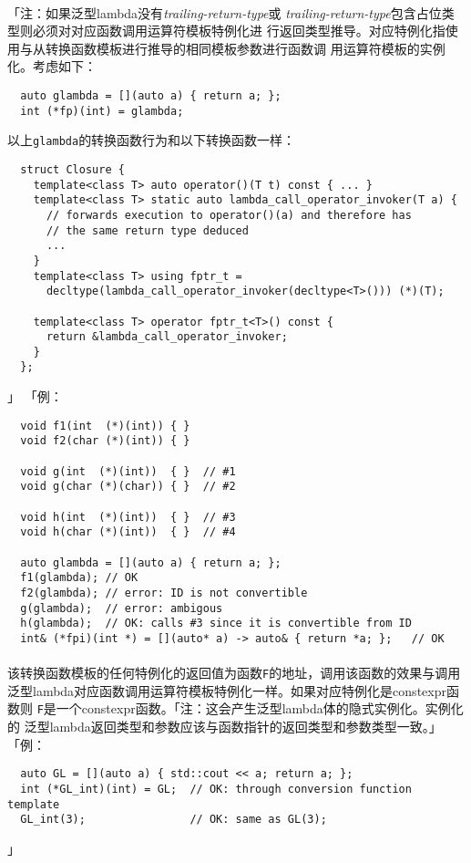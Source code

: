 \paragraph{}
「注：如果泛型lambda没有\textit{trailing-return-type}或
\textit{trailing-return-type}包含占位类型则必须对对应函数调用运算符模板特例化进
行返回类型推导。对应特例化指使用与从转换函数模板进行推导的相同模板参数进行函数调
用运算符模板的实例化。考虑如下：
\begin{lstlisting}
  auto glambda = [](auto a) { return a; };
  int (*fp)(int) = glambda;
\end{lstlisting}
以上\texttt{glambda}的转换函数行为和以下转换函数一样：
\begin{lstlisting}
  struct Closure {
    template<class T> auto operator()(T t) const { ... }
    template<class T> static auto lambda_call_operator_invoker(T a) {
      // forwards execution to operator()(a) and therefore has
      // the same return type deduced
      ...
    }
    template<class T> using fptr_t =
      decltype(lambda_call_operator_invoker(decltype<T>())) (*)(T);

    template<class T> operator fptr_t<T>() const {
      return &lambda_call_operator_invoker;
    }
  };
\end{lstlisting}」
「例：
\begin{lstlisting}
  void f1(int  (*)(int)) { }
  void f2(char (*)(int)) { }

  void g(int  (*)(int))  { }  // #1
  void g(char (*)(char)) { }  // #2

  void h(int  (*)(int))  { }  // #3
  void h(char (*)(int))  { }  // #4

  auto glambda = [](auto a) { return a; };
  f1(glambda); // OK
  f2(glambda); // error: ID is not convertible
  g(glambda);  // error: ambigous
  h(glambda);  // OK: calls #3 since it is convertible from ID
  int& (*fpi)(int *) = [](auto* a) -> auto& { return *a; };   // OK
\end{lstlisting}

\paragraph{}
该转换函数模板的任何特例化的返回值为函数\texttt{F}的地址，调用该函数的效果与调用
泛型lambda对应函数调用运算符模板特例化一样。如果对应特例化是constexpr函数则
\texttt{F}是一个constexpr函数。「注：这会产生泛型lambda体的隐式实例化。实例化的
泛型lambda返回类型和参数应该与函数指针的返回类型和参数类型一致。」「例：
\begin{lstlisting}
  auto GL = [](auto a) { std::cout << a; return a; };
  int (*GL_int)(int) = GL;  // OK: through conversion function template
  GL_int(3);                // OK: same as GL(3);
\end{lstlisting}」

